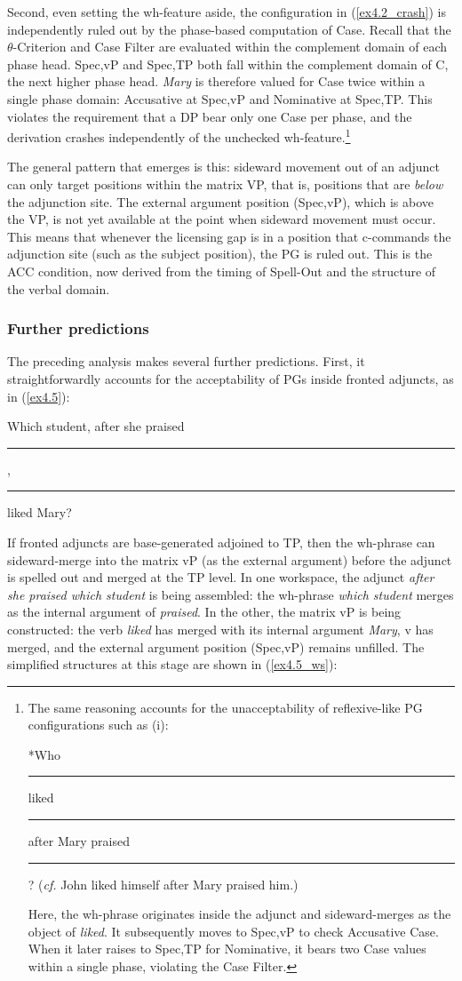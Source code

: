 \documentclass[12pt]{article}
\newcommand{\gap}{\rule{1.25em}{.5pt}} %
\begin{document}
Second, even setting the wh-feature aside, the configuration in (\ref{ex4.2_crash}) is independently ruled out by the phase-based computation of Case. Recall that the $\theta$-Criterion and Case Filter are evaluated within the complement domain of each phase head. Spec,vP and Spec,TP both fall within the complement domain of C, the next higher phase head. \textit{Mary} is therefore valued for Case twice within a single phase domain: Accusative at Spec,vP and Nominative at Spec,TP. This violates the requirement that a DP bear only one Case per phase, and the derivation crashes independently of the unchecked wh-feature.\footnote{The same reasoning accounts for the unacceptability of reflexive-like PG configurations such as (i):

\ex[exno=i] \label{fn3}
*Who \gap{} liked \gap{} after Mary praised \gap{}? (\emph{cf.} John liked himself after Mary praised him.)
\xe

\noindent
Here, the wh-phrase originates inside the adjunct and sideward-merges as the object of \textit{liked}. It subsequently moves to Spec,vP to check Accusative Case. When it later raises to Spec,TP for Nominative, it bears two Case values within a single phase, violating the Case Filter.}

The general pattern that emerges is this: sideward movement out of an adjunct can only target positions within the matrix VP, that is, positions that are \textit{below} the adjunction site. The external argument position (Spec,vP), which is above the VP, is not yet available at the point when sideward movement must occur. This means that whenever the licensing gap is in a position that c-commands the adjunction site (such as the subject position), the PG is ruled out. This is the ACC condition, now derived from the timing of Spell-Out and the structure of the verbal domain.

\subsubsection{Further predictions}

The preceding analysis makes several further predictions. First, it straightforwardly accounts for the acceptability of PGs inside fronted adjuncts, as in (\ref{ex4.5}):

\ex \label{ex4.5}
Which student, after she praised \gap{}, \gap{} liked Mary?
\xe

\noindent
If fronted adjuncts are base-generated adjoined to TP, then the wh-phrase can sideward-merge into the matrix vP (as the external argument) before the adjunct is spelled out and merged at the TP level. In one workspace, the adjunct \textit{after she praised which student} is being assembled: the wh-phrase \textit{which student} merges as the internal argument of \textit{praised}. In the other, the matrix vP is being constructed: the verb \textit{liked} has merged with its internal argument \textit{Mary}, v has merged, and the external argument position (Spec,vP) remains unfilled. The simplified structures at this stage are shown in (\ref{ex4.5_ws}):
\end{document}

